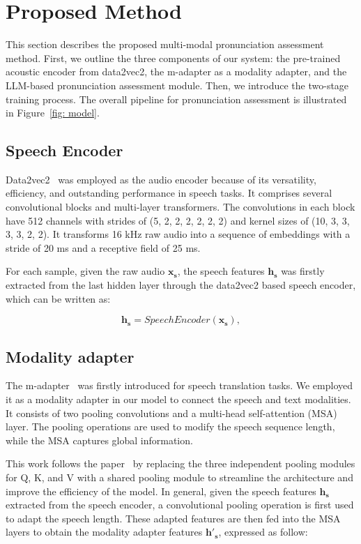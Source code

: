 
\section{Proposed Method}
This section describes the proposed multi-modal pronunciation assessment method. First, we outline the three components of our system: the pre-trained acoustic encoder from data2vec2, the m-adapter as a modality adapter, and the LLM-based pronunciation assessment module. Then, we introduce the two-stage training process. The overall pipeline for pronunciation assessment is illustrated in Figure~\ref{fig: model}. 

\subsection{Speech Encoder}
Data2vec2~\cite{data2vec2} was employed as the audio encoder because of its versatility, efficiency, and outstanding performance in speech tasks. It comprises several convolutional blocks and multi-layer transformers. The convolutions in each block have 512 channels with strides of (5, 2, 2, 2, 2, 2, 2) and kernel sizes of (10, 3, 3, 3, 3, 2, 2). It transforms 16 kHz raw audio into a sequence of embeddings with a stride of 20 ms and a receptive field of 25 ms.

For each sample, given the raw audio $\mathbf{x_s}$, the speech features $\mathbf{h_s}$ was firstly extracted from the last hidden layer through the data2vec2 based speech encoder, which can be written as:

\begin{equation}
\label{eq:speech_encoder}
\mathbf{h_s} =  {SpeechEncoder}(\mathbf{x_s}),
\end{equation}


\subsection{Modality adapter}
The m-adapter~\cite{m-adapter} was firstly introduced for speech translation tasks. We employed it as a modality adapter in our model to connect the speech and text modalities. It consists of two pooling convolutions and a multi-head self-attention (MSA) layer. The pooling operations are used to modify the speech sequence length, while the MSA captures global information.

This work follows the paper~\cite{seamless} by replacing the three independent pooling modules for Q, K, and V with a shared pooling module to streamline the architecture and improve the efficiency of the model. In general, given the speech features $\mathbf{h_s}$ extracted from the speech encoder, a convolutional pooling operation is first used to adapt the speech length. These adapted features are then fed into the MSA layers to obtain the modality adapter features $\mathbf{{h'}_s}$, expressed as follow:

